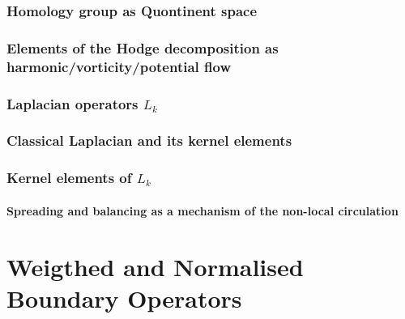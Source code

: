 \subsubsection{Homology group as Quontinent space}

\subsubsection{ Elements of the Hodge decomposition as harmonic/vorticity/potential flow}

\subsubsection{ Laplacian operators \( L_k \) }

\subsubsection{ Classical Laplacian and its kernel elements }

\subsubsection{ Kernel elements of \( L_k \) }


\paragraph{ Spreading and balancing as a mechanism of the non-local circulation}
















\section{ Weigthed and Normalised Boundary Operators}


